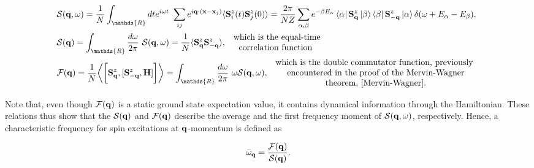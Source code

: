 \begin{equation}
\begin{split}
    &\mathcal{S}({\bf q}, \omega) = \frac{1}{N} \int_{\mathds{R}} dt e^{i \omega t} \blanky \sum_{ij} e^{i {\bf q} \cdot ({\bf x} - {\bf x}_j)} \langle \spin_i^z(t) \spin_j^z(0) \rangle = \frac{2\pi}{NZ} \sum_{\alpha, \beta} e^{-\beta E_{\alpha}} \bra{\alpha} \spin_{{\bf q}}^z \ket{\beta} \bra{\beta} \spin^z_{-{\bf q}} \ket{\alpha} \delta(\omega + E_{\alpha} - E_{\beta}), \\
    &\mathcal{S}({\bf q}) = \int_{\mathds{R}} \frac{d\omega}{2\pi} \blanky \mathcal{S}({\bf q}, \omega) = \frac{1}{N} \langle \spin_{{\bf q}}^z \spin_{-{\bf q}}^z \rangle,  \begin{array}{c}
         \textnormal{ which is the equal-time}  \\
         \textnormal{ correlation function }
    \end{array} \\
    &\mathcal{F}({\bf q}) = \frac{1}{N} \bigg \langle \bigg[\spin_{{\bf q}}^z, [\spin_{-{\bf q}}^z, {\bf H}]\bigg] \bigg \rangle = \int_{\mathds{R}} \frac{d\omega}{2\pi} \blanky \omega \mathcal{S}({\bf q}, \omega), \begin{array}{cc}
         \textnormal{ which is the double commutator function, previously } \\
         \textnormal{  encountered in the proof of the Mervin-Wagner} \\
         \textnormal{ theorem,  \cref{Mervin-Wagner}.}
    \end{array}
    \label{Goldstone_spin_dynamical_factors}
\end{split}
\end{equation}

Note that, even though $\mathcal{F}({\bf q})$ is a static ground state expectation value, it contains dynamical information through the Hamiltonian. These relations thus show that the $\mathcal{S}({\bf q})$ and $\mathcal{F}({\bf q})$ describe the average and the first frequency moment of $\mathcal{S}({\bf q}, \omega)$, respectively. Hence, a characteristic frequency for spin excitations at ${\bf q}$-momentum is defined as 

\begin{equation}
    \bar{\omega}_{{\bf q}} = \frac{\mathcal{F}({\bf q})}{\mathcal{S}({\bf q})}. 
    \label{Goldstone_char_freq}
\end{equation}

\blanky \\

